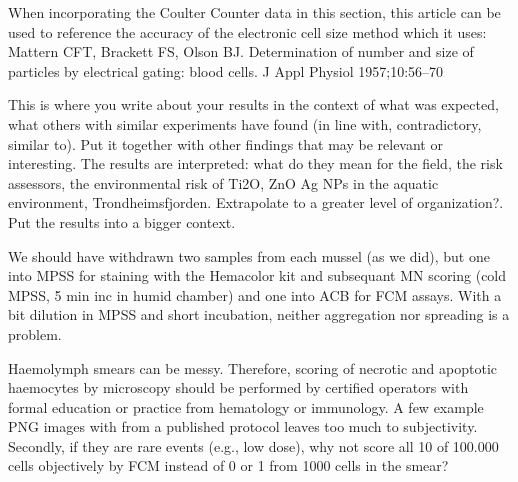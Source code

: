 When incorporating the Coulter Counter data in this section, this article can be used to reference the accuracy of the electronic cell size method which it uses: Mattern CFT, Brackett FS, Olson BJ. Determination of number and size of particles by electrical gating: blood cells. J Appl Physiol 1957;10:56–70

This is where you write about your results in the context of what was expected, what others with similar experiments have found (in line with, contradictory, similar to). Put it together with other findings that may be relevant or interesting. The results are interpreted: what do they mean for the field, the risk assessors, the environmental risk of Ti2O, ZnO Ag NPs in the aquatic environment, Trondheimsfjorden. Extrapolate to a greater level of organization?. Put the results into a bigger context.


We should have withdrawn two samples from each mussel (as we did), but one into MPSS for staining with the Hemacolor kit and subsequant MN scoring (cold MPSS, 5 min inc in humid chamber) and one into ACB for FCM assays. With a bit dilution in MPSS and short incubation, neither aggregation nor spreading is a problem.

Haemolymph smears can be messy. Therefore, scoring of necrotic and apoptotic haemocytes by microscopy should be performed by certified operators with formal education or practice from hematology or immunology. A few example PNG images with from a published protocol leaves too much to subjectivity. Secondly, if they are rare events (e.g., low dose), why not score all 10 of 100.000 cells objectively by FCM instead of 0 or 1 from 1000 cells in the smear?